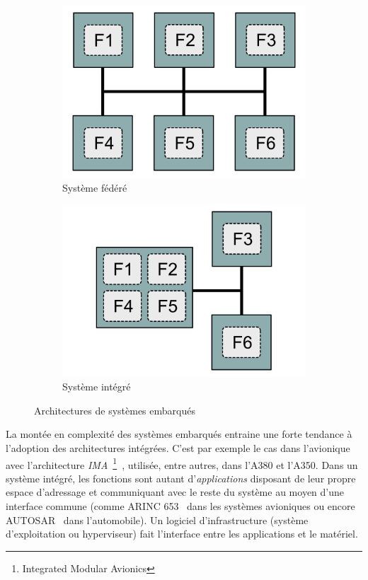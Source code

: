 \begin{figure}[!h]
	\centering
	\begin{subfigure}{0,4\linewidth}
		\centering
		\includegraphics[width=\linewidth]{graphics/figures/federated.pdf}
		\caption{\label{fig:federe}Système fédéré}
	\end{subfigure}
	\begin{subfigure}{0,4\linewidth}
		\centering
		\includegraphics[width=\linewidth]{graphics/figures/integrated.pdf}
		\caption{\label{fig:integre}Système intégré}
	\end{subfigure}
	\caption{\label{fig:integre_federe}Architectures de systèmes embarqués}
\end{figure}

La montée en complexité des systèmes embarqués entraine une forte tendance à l'adoption des architectures intégrées.
C'est par exemple le cas dans l'avionique avec l'architecture \emph{IMA}~\footnote{Integrated Modular Avionics}~\cite{prisaznuk1992integrated}, utilisée, entre autres, dans l'A380 et l'A350.
Dans un système intégré, les fonctions sont autant d'\emph{applications} disposant de leur propre espace d'adressage et communiquant avec le reste du système au moyen d'une interface commune (comme ARINC 653~\cite{prisaznuk2008arinc} dans les systèmes avioniques ou encore AUTOSAR~\cite{autosar} dans l'automobile).
Un logiciel d'infrastructure (système d'exploitation ou hyperviseur) fait l'interface entre les applications et le matériel.

